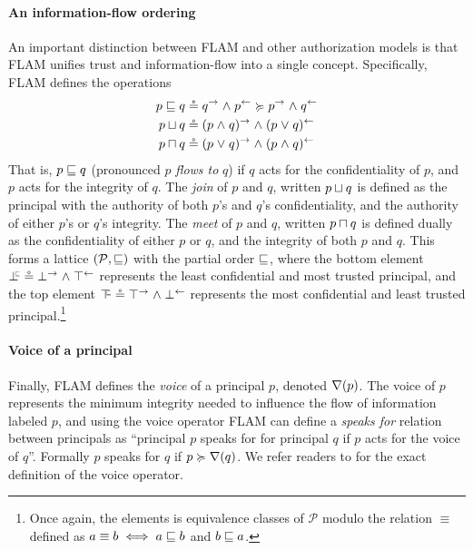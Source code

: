 \paragraph{An information-flow ordering}
An important distinction between FLAM and other authorization models is that FLAM unifies trust and information-flow into a single concept. Specifically, FLAM defines the operations
\begin{align*}
p \sqsubseteq q &\circeq q^{\rightarrow} \mathrel{\land} p^{\leftarrow} \succcurlyeq p^{\rightarrow} \mathrel{\land} q^{\leftarrow}\\
p \sqcup q &\circeq (p \mathrel{\land} q)^{\rightarrow} \mathrel{\land} (p \mathrel{\lor} q)^{\leftarrow} \\
p \sqcap q &\circeq (p \mathrel{\lor} q)^{\rightarrow} \mathrel{\land} (p \mathrel{\land} q)^{\leftarrow}
\end{align*}
That is, $p \sqsubseteq q$ (pronounced $p$ \emph{flows to} $q$) if $q$ acts for the confidentiality of $p$, and $p$ acts for the integrity of $q$. The \emph{join} of $p$ and $q$, written $p \sqcup q$ is defined as the principal with the authority of both $p$'s and $q$'s confidentiality, and the authority of either $p$'s or $q$'s integrity. The \emph{meet} of $p$ and $q$, written $p \sqcap q$ is defined dually as the confidentiality of either $p$ or $q$, and the integrity of both $p$ and $q$.
This forms a lattice $(\mathcal{P}, \sqsubseteq)$ with the partial order $\sqsubseteq$, where the bottom element $\botinfoflow \circeq \conf{\bot} \conj \integ{\top}$ represents the least confidential and most trusted principal, and the top element $\topinfoflow \circeq \conf{\top} \conj \integ{\bot}$ represents the most confidential and least trusted principal.\footnote{Once again, the elements is equivalence classes of $\mathcal{P}$ modulo the relation $\equiv$ defined as $a \equiv b \iff a \sqsubseteq b$ and $b \sqsubseteq a$.}

\paragraph{Voice of a principal}
Finally, FLAM defines the \emph{voice} of a principal $p$, denoted $\nabla(p)$. The voice of $p$ represents the minimum integrity needed to influence the flow of information labeled $p$, and using the voice operator FLAM can define a \emph{speaks for} relation \cite{Lampson:1992:ADS:138873.138874, Abadi:2006:ACC:1159803.1159839} between principals as ``principal $p$ speaks for for principal $q$ if $p$ acts for the voice of $q$''. Formally $p$ speaks for $q$ if $p \succcurlyeq \nabla(q)$. We refer readers to \cite{Arden:2015:FA:2859845.2859998} for the exact definition of the voice operator.

